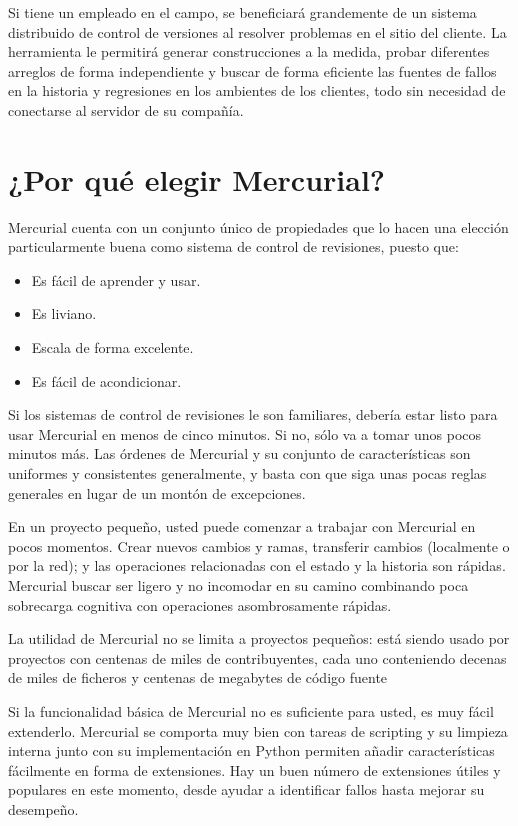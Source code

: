 Si tiene un empleado en el campo, se beneficiará grandemente de un
sistema distribuido de control de versiones al resolver problemas en
el sitio del cliente. La herramienta le permitirá generar
construcciones a la medida, probar diferentes arreglos de forma
independiente y buscar de forma eficiente las fuentes de fallos en la
historia y regresiones en los ambientes de los clientes, todo sin
necesidad de conectarse al servidor de su compañía.

\section{¿Por qué elegir Mercurial?}

Mercurial cuenta con un conjunto único de propiedades que lo hacen
una elección particularmente buena como sistema de control de
revisiones, puesto que:
\begin{itemize}
\item Es fácil de aprender y usar.
\item Es liviano.
\item Escala de forma excelente.
\item Es fácil de acondicionar.
\end{itemize}

Si los sistemas de control de revisiones le son familiares, debería
estar listo para usar Mercurial en menos de cinco minutos. Si no, sólo va a
tomar unos pocos minutos más. Las órdenes de Mercurial y su conjunto
de características son uniformes y consistentes generalmente, y basta
con que siga unas pocas reglas generales en lugar de un montón de
excepciones.

En un proyecto pequeño, usted puede comenzar a trabajar con Mercurial en
pocos momentos. Crear nuevos cambios y ramas, transferir cambios (localmente
o por la red); y las operaciones relacionadas con el estado y la
historia son rápidas. Mercurial buscar ser ligero y no incomodar en su
camino combinando poca sobrecarga cognitiva con operaciones
asombrosamente rápidas.

La utilidad de Mercurial no se limita a proyectos pequeños: está
siendo usado por proyectos con centenas de miles de contribuyentes,
cada uno conteniendo decenas de miles de ficheros y centenas de
megabytes de código fuente

Si la funcionalidad básica de Mercurial no es suficiente para usted,
es muy fácil extenderlo. Mercurial se comporta muy bien con tareas de
scripting y su limpieza interna junto con su implementación en Python
permiten añadir características fácilmente en forma de extensiones.
Hay un buen número de extensiones útiles y populares en este momento,
desde ayudar a identificar fallos hasta mejorar su desempeño.

